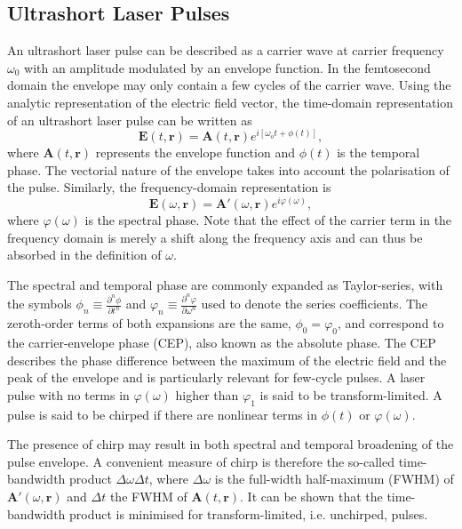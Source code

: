 \documentclass[a4paper]{jpconf}
\begin{document}
\subsection{Ultrashort Laser Pulses}
An ultrashort laser pulse can be described as a carrier wave at carrier frequency $\omega_0$ with an amplitude modulated by an envelope function. In the femtosecond domain the envelope may only contain a few cycles of the carrier wave. Using the analytic representation of the electric field vector, the time-domain representation of an ultrashort laser pulse can be written as 
\begin{equation}
\mathbf{E}(t, \mathbf{r}) = \mathbf{A}(t, \mathbf{r}) e^{i[ \omega_o t + \phi(t)]},
\end{equation}
where $\mathbf{A}(t, \mathbf{r})$ represents the envelope function and $\phi(t)$ is the temporal phase. The vectorial nature of the envelope takes into account the polarisation of the pulse. Similarly, the frequency-domain representation is 
\begin{equation}
\mathbf{E}(\omega, \mathbf{r}) = \mathbf{A}'(\omega, \mathbf{r}) e^{i \varphi(\omega)},
\end{equation}
where $\varphi(\omega)$ is the spectral phase. Note that the effect of the carrier term in the frequency domain is merely a shift along the frequency axis and can thus be absorbed in the definition of $\omega$. \par 
The spectral and temporal phase are commonly expanded as Taylor-series, with the symbols $\phi_n \equiv \frac{\partial^n \phi}{\partial t^n}$ and $\varphi_n \equiv \frac{\partial^n \varphi}{\partial \omega^n}$ used to denote the series coefficients. The zeroth-order terms of both expansions are the same, $\phi_0 = \varphi_0$, and correspond to the carrier-envelope phase (CEP), also known as the absolute phase. The CEP describes the phase difference between the maximum of the electric field and the peak of the envelope and is particularly relevant for few-cycle pulses. A laser pulse with no terms in $\varphi(\omega)$ higher than $\varphi_1$ is said to be transform-limited. A pulse is said to be chirped if there are nonlinear terms in $\phi(t)$ or $\varphi(\omega)$. \par 
The presence of chirp may result in both spectral and temporal broadening of the pulse envelope. A convenient measure of chirp is therefore the so-called time-bandwidth product $\Delta \omega \Delta t$, where $\Delta \omega$ is the full-width half-maximum (FWHM) of $\mathbf{A}'(\omega, \mathbf{r})$ and $\Delta t$ the FWHM of $\mathbf{A}(t, \mathbf{r})$. It can be shown that the time-bandwidth product is minimised for transform-limited, i.e. unchirped, pulses. \par 
\end{document}
